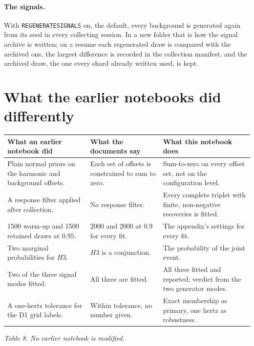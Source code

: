 \documentclass[10pt,a4paper]{article}
\newcommand{\code}[1]{\texttt{\UseBreakableUnderscores #1}}
\newcommand{\UseBreakableUnderscores}{\def\_{\textunderscore\allowbreak}}
\begin{document}
\paragraph{The signals.} With \code{REGENERATE\_SIGNALS} on, the default, every background is generated again from its seed in every collecting session. In a new folder that is how the signal archive is written; on a resume each regenerated draw is compared with the archived one, the largest difference is recorded in the collection manifest, and the archived draw, the one every shard already written used, is kept.

\section{What the earlier notebooks did differently}
\begin{center}\small
\begin{tabularx}{\textwidth}{@{}YYY@{}}
\toprule
\textbf{What an earlier notebook did} & \textbf{What the documents say} & \textbf{What this notebook does}\\
\midrule
Plain normal priors on the harmonic and background offsets. & Each set of offsets is constrained to sum to zero. & Sum-to-zero on every offset set, not on the configuration level.\\
A response filter applied after collection. & No response filter. & Every complete triplet with finite, non-negative recoveries is fitted.\\
1500 warm-up and 1500 retained draws at $0.95$. & 2000 and 2000 at $0.9$ for every fit. & The appendix's settings for every fit.\\
Two marginal probabilities for $H3$. & $H3$ is a conjunction. & The probability of the joint event.\\
Two of the three signal modes fitted. & All three are fitted. & All three fitted and reported; verdict from the two generator modes.\\
A one-hertz tolerance for the D1 grid labels. & Within tolerance, no number given. & Exact membership as primary, one hertz as robustness.\\
\bottomrule
\end{tabularx}
\end{center}
{\small\itshape Table 8. No earlier notebook is modified.}
\end{document}
